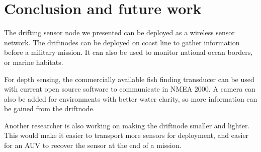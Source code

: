\section[Conclusion]{Conclusion and future work}

The drifting sensor node we presented can be deployed as a wireless sensor network.
The driftnodes can be deployed on coast line to gather information before a military mission.
It can also be used to monitor national ocean borders, or marine habitats.

For depth sensing, the commercially available fish finding transducer can be used with current open source software to communicate in NMEA 2000.
A camera can also be added for environments with better water clarity, so more information can be gained from the driftnode.

Another researcher is also working on making the driftnode smaller and lighter.
This would make it easier to transport more sensors for deployment, and easier for an AUV to recover the sensor at the end of a mission.
